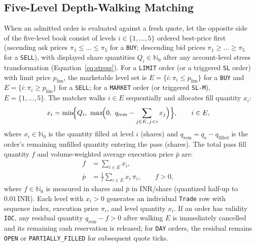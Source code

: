 \documentclass[journal,onecolumn,10pt]{IEEEtran}
\newcommand{\thinunit}[2]{#1\,\text{#2}}
\begin{document}
\subsection{Five-Level Depth-Walking Matching}
When an admitted order is evaluated against a fresh quote, let the opposite side of the five-level book consist of levels $i\in\{1,\dots,5\}$ ordered best-price first (ascending ask prices $\pi_1 \le \dots \le \pi_5$ for a \texttt{BUY}; descending bid prices $\pi_1 \ge \dots \ge \pi_5$ for a \texttt{SELL}), with displayed share quantities $Q_i \in \mathbb{N}_0$ after any account-level stress transformation (Equation~\eqref{eq:stress}). For a \texttt{LIMIT} order (or a triggered \texttt{SL} order) with limit price $p_{\mathrm{lim}}$, the marketable level set is $E = \{i : \pi_i \le p_{\mathrm{lim}}\}$ for a \texttt{BUY} and $E = \{i : \pi_i \ge p_{\mathrm{lim}}\}$ for a \texttt{SELL}; for a \texttt{MARKET} order (or triggered \texttt{SL-M}), $E = \{1,\dots,5\}$. The matcher walks $i \in E$ sequentially and allocates fill quantity $x_i$:
\begin{equation}
x_i = \min\!\Bigl\{Q_i,\ \max\!\Bigl(0,\ q_{\mathrm{rem}}-\sum_{j\in E,\,j<i}x_j\Bigr)\Bigr\},\qquad i\in E,
\label{eq:alloc}
\end{equation}
where $x_i \in \mathbb{N}_0$ is the quantity filled at level $i$ (shares) and $q_{\mathrm{rem}} = q_o - q_{\mathrm{filled}}$ is the order's remaining unfilled quantity entering the pass (shares). The total pass fill quantity $f$ and volume-weighted average execution price $\bar{p}$ are:
\begin{align}
f &= \sum_{i\in E}x_i, \label{eq:filled}\\
\bar{p} &= \frac{1}{f}\sum_{i\in E}x_i\,\pi_i,\qquad f>0, \label{eq:vwap}
\end{align}
where $f\in\mathbb{N}_0$ is measured in shares and $\bar{p}$ in INR/share (quantized half-up to $\thinunit{0.01}{INR}$). Each level with $x_i > 0$ generates an individual \texttt{Trade} row with sequence index, execution price $\pi_i$, and level quantity $x_i$. If an order has validity \texttt{IOC}, any residual quantity $q_{\mathrm{rem}} - f > 0$ after walking $E$ is immediately cancelled and its remaining cash reservation is released; for \texttt{DAY} orders, the residual remains \texttt{OPEN} or \texttt{PARTIALLY\_FILLED} for subsequent quote ticks.
\end{document}
